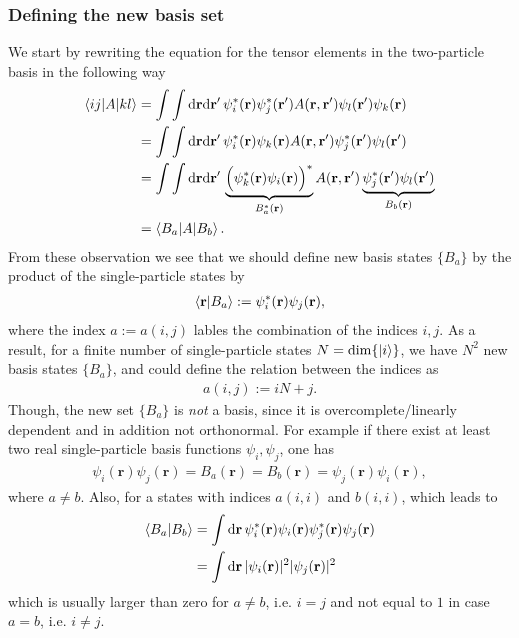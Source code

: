 \documentclass[12pt,a4paper]{scrartcl}
\numberwithin{equation}{section}
\renewcommand{\vec}{\mathbf}
\begin{document}
\subsubsection{Defining the new basis set}
We start by rewriting the equation for the tensor elements in the two-particle basis in the 
following way 
\begin{align}
 \braket{ij | A | kl }  
&= \int \int \mathrm{d}\vec{r}\mathrm{d}\vec{r}' \, \psi^*_i(\vec{r})\psi^*_j(\vec{r}') 
                                          A(\vec{r},\vec{r}') \psi_l(\vec{r}')\psi_k(\vec{r}) \\
%
&= \int \int \mathrm{d}\vec{r}\mathrm{d}\vec{r}' \, \psi^*_i(\vec{r})\psi_k(\vec{r}) 
                                          A(\vec{r},\vec{r}') \psi^*_j(\vec{r}')\psi_l(\vec{r}') \\
%
&= \int \int \mathrm{d}\vec{r}\mathrm{d}\vec{r}' \, \underbrace{ \Big( \psi^*_k(\vec{r}) \psi_i(\vec{r}) \Big)^* }_{B^*_a(\vec{r})}
                                          A(\vec{r},\vec{r}') \underbrace{ \psi^*_j(\vec{r}')\psi_l(\vec{r}') }_{B_b(\vec{r} )} \\
&= \braket{ B_a | A | B_b } .
\end{align}
From these observation we see that we should define new basis states $\{ B_a \}$ by the product of the single-particle
states by
\begin{align}
 \braket{ \vec{r} | B_a } := \psi^*_i(\vec{r}) \psi_j(\vec{r}),
\end{align}
where the index $a:=a(i,j)$ lables the combination of the indices $i,j$. As a result, for a finite number of single-particle
states $N=\mathrm{dim}\{ \ket{i} \}$, we have $N^2$ new basis states $\{ B_a \}$, and could define the relation between the indices
as
\begin{align}
 a(i,j) := iN + j.
\end{align}
Though, the new set $\{ B_a \}$ is \textit{not} a basis, since it is overcomplete/linearly dependent and in addition not orthonormal.
For example if there exist at least two real single-particle basis functions $\psi_i,\psi_j$, one has 
\begin{align}
\psi_i(\vec{r})\psi_j(\vec{r}) = B_a(\vec{r}) = B_b(\vec{r}) = \psi_j(\vec{r})\psi_i(\vec{r}),
\end{align}
where $a\neq b$.
Also, for a states with indices $a(i,i)$ and $b(i,i)$, which leads to
\begin{align}
 \braket{B_a | B_b} &= \int \mathrm{d}\vec{r} \, \psi^*_i(\vec{r}) \psi_i(\vec{r}) \psi^*_j(\vec{r}) \psi_j(\vec{r}) \\
 &= \int \mathrm{d}\vec{r} \, |\psi_i(\vec{r})|^2 |\psi_j(\vec{r})|^2 
\end{align}
which is usually larger than zero for $a\neq b$, i.e. $i=j$ and not equal to $1$ in case $a=b$, i.e. $i\neq j$.
\end{document}
